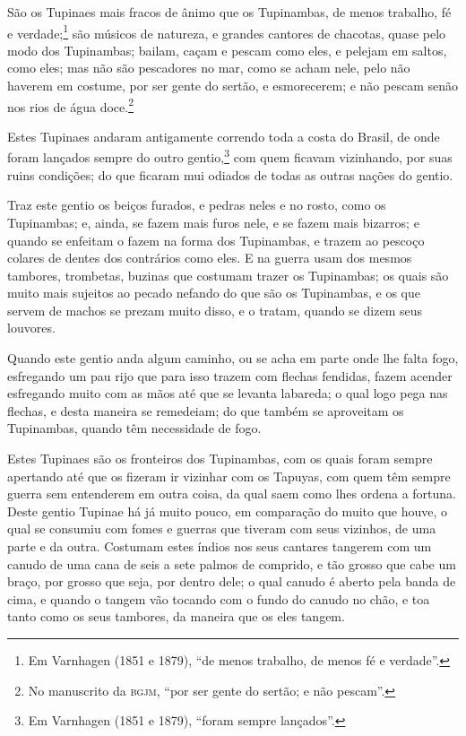 São os Tupinaes mais fracos de ânimo que os Tupinambas, de menos trabalho, fé e
verdade;\footnote{ Em Varnhagen (1851 e 1879), ``de menos trabalho, de menos fé e
verdade''.} são músicos de natureza, e grandes cantores de chacotas, quase pelo modo dos
Tupinambas; bailam, caçam e pescam como eles, e pelejam em saltos, como eles; mas não são
pescadores no mar, como se acham nele, pelo não haverem em costume, por ser gente do
sertão, e esmorecerem; e não pescam senão nos rios de água doce.\footnote{ No manuscrito
da \textsc{bgjm}, ``por ser gente do sertão; e não pescam''.}

Estes Tupinaes andaram antigamente correndo toda a costa do Brasil, de onde foram lançados
sempre do outro gentio,\footnote{ Em Varnhagen (1851 e 1879), ``foram sempre lançados''.}
com quem ficavam vizinhando, por suas ruins condições; do que ficaram mui odiados de todas
as outras nações do gentio.

Traz este gentio os beiços furados, e pedras neles e no rosto, como os Tupinambas; e,
ainda, se fazem mais furos nele, e se fazem mais bizarros; e quando se enfeitam o fazem na
forma dos Tupinambas, e trazem ao pescoço colares de dentes dos contrários como eles. E na
guerra usam dos mesmos tambores, trombetas, buzinas que costumam trazer os Tupinambas; os
quais são muito mais sujeitos ao pecado nefando do que são os Tupinambas, e os que servem
de machos se prezam muito disso, e o tratam, quando se dizem seus louvores.

Quando este gentio anda algum caminho, ou se acha em parte onde lhe falta fogo, esfregando
um pau rijo que para isso trazem com flechas fendidas, fazem acender esfregando muito com
as mãos até que se levanta labareda; o qual logo pega nas flechas, e desta maneira se
remedeiam; do que também se aproveitam os Tupinambas, quando têm necessidade de fogo.

Estes Tupinaes são os fronteiros dos Tupinambas, com os quais foram sempre apertando até
que os fizeram ir vizinhar com os Tapuyas, com quem têm sempre guerra sem entenderem em
outra coisa, da qual saem como lhes ordena a fortuna. Deste gentio Tupinae há já muito
pouco, em comparação do muito que houve, o qual se consumiu com fomes e guerras que
tiveram com seus vizinhos, de uma parte e da outra. Costumam estes índios nos seus
cantares tangerem com um canudo de uma cana de seis a sete palmos de comprido, e tão
grosso que cabe um braço, por grosso que seja, por dentro dele; o qual canudo é aberto
pela banda de cima, e quando o tangem vão tocando com o fundo do canudo no chão, e toa
tanto como os seus tambores, da maneira que os eles tangem.

